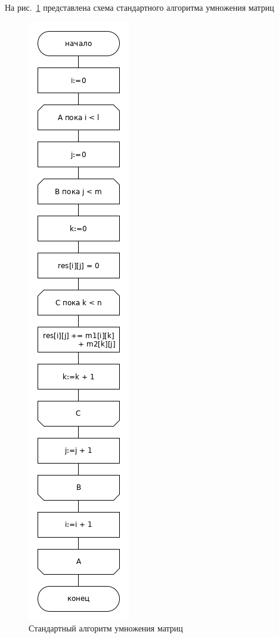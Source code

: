 \documentclass[a4paper,12pt]{article}
\begin{document}
	На рис.~\ref{ris:simple} представлена схема стандартного алгоритма умножения матриц
	 		\begin{figure}[H]
	 			\centering
	 			{
	 				\includegraphics[scale=0.51]{simple_mult.png}
	 				\caption{\label{ris:simple}Стандартный алгоритм умножения матриц}	
	 			}
	 		\end{figure}
	
\end{document}
